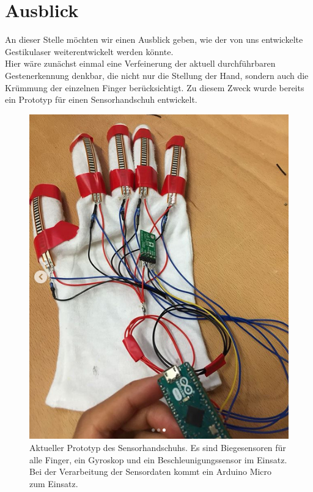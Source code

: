 \chapter{Ausblick}
\label{ch:Ausblick}

An dieser Stelle möchten wir einen Ausblick geben, wie der von uns entwickelte Gestikulaser  weiterentwickelt werden könnte. \\
Hier wäre zunächst einmal eine Verfeinerung der aktuell durchführbaren Gestenerkennung denkbar, die nicht nur die Stellung der Hand, sondern auch die Krümmung der einzelnen Finger berücksichtigt. Zu diesem Zweck wurde bereits ein Prototyp für einen Sensorhandschuh entwickelt. 
\begin{figure}[H]
	\centering
	\includegraphics[scale=0.75]{../figures/Sensorhandschuh}
	\caption{Aktueller Prototyp des Sensorhandschuhs. Es sind Biegesensoren für alle Finger, ein Gyroskop und ein Beschleunigungssensor im Einsatz. Bei der  
	Verarbeitung der Sensordaten kommt ein Arduino Micro zum Einsatz.}
	\label{fig:Sensorhandschuh}
\end{figure}
\noindent
